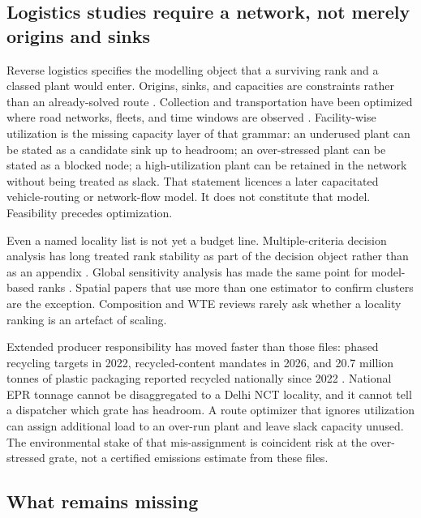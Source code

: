 \documentclass[12pt,a4paper]{article}
\begin{document}
\subsection{Logistics studies require a network, not merely origins and sinks}

Reverse logistics specifies the modelling object that a surviving rank and a classed plant would enter. Origins, sinks, and capacities are constraints rather than an already-solved route \citep{fleischmann_rl_1997,govindan_rl_2015}. Collection and transportation have been optimized where road networks, fleets, and time windows are observed \citep{das_bhattacharyya_2015}. Facility-wise utilization is the missing capacity layer of that grammar: an underused plant can be stated as a candidate sink up to headroom; an over-stressed plant can be stated as a blocked node; a high-utilization plant can be retained in the network without being treated as slack. That statement licences a later capacitated vehicle-routing or network-flow model. It does not constitute that model. Feasibility precedes optimization.

Even a named locality list is not yet a budget line. Multiple-criteria decision analysis has long treated rank stability as part of the decision object rather than as an appendix \citep{belton_stewart_2002}. Global sensitivity analysis has made the same point for model-based ranks \citep{saltelli_sensitivity_2008}. Spatial papers that use more than one estimator to confirm clusters \citep{ieam_kota_landuse_msw_2026} are the exception. Composition and WTE reviews rarely ask whether a locality ranking is an artefact of scaling.

Extended producer responsibility has moved faster than those files: phased recycling targets in 2022, recycled-content mandates in 2026, and 20.7 million tonnes of plastic packaging reported recycled nationally since 2022 \citep{cpcb_pwm_amendment_2022,cpcb_pwm_amendment_2026,pib_plastic_waste_2025,pib_epr_targets_2025,dte_epr_recycled_2026,ht_epr_framework_2026}. National EPR tonnage cannot be disaggregated to a Delhi NCT locality, and it cannot tell a dispatcher which grate has headroom. A route optimizer that ignores utilization can assign additional load to an over-run plant and leave slack capacity unused. The environmental stake of that mis-assignment is coincident risk at the over-stressed grate, not a certified emissions estimate from these files.

\subsection{What remains missing}
\end{document}
